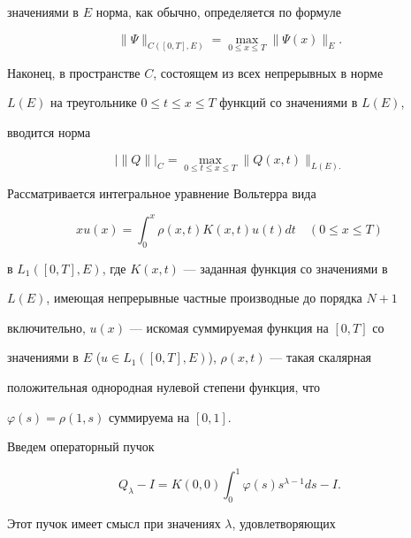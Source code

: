 значениями в $E$ норма, как обычно, определяется по формуле 


$$ 


\|\Psi\|_{C([0,T],E)}=\max_{0\le x\le T}\|\Psi(x)\|_E. 


$$ 


 


Наконец, в пространстве $C$, состоящем из всех непрерывных в норме 


$L(E)$ на треугольнике $0\le t\le x\le T$ функций со значениями в $L(E)$, 


вводится норма 


$$ 


\big|\|Q\|\big|_C=\max_{0\le t\le x\le T} 


\|Q(x,t)\|_{L(E).} 


$$ 


 


Рассматривается интегральное уравнение Вольтерра вида 


\begin{equation} 


xu(x)=\int^x_0 \rho(x,t)K(x,t)u(t)dt\quad (0\le x\le T) 


\end{equation} 


в $L_1([0,T],E)$, где $K(x,t)$ --- заданная функция со значениями в 


$L(E)$, имеющая непрерывные частные производные до порядка $N+1$ 


включительно, $u(x)$ --- искомая суммируемая функция на $[0,T]$ со 


значениями в $E$ ($u\in L_1([0,T],E)$), $\rho(x,t)$ --- такая скалярная 


положительная однородная нулевой степени функция, что 


$\varphi(s)=\rho(1,s)$ суммируема на $[0,1]$. 


 


Введем операторный пучок 


\begin{equation} 


Q_\lambda-I=K(0,0)\int^1_0\varphi(s)s^{\lambda-1}ds-I. 


\end{equation} 


 


Этот пучок имеет смысл при значениях $\lambda$, удовлетворяющих 


